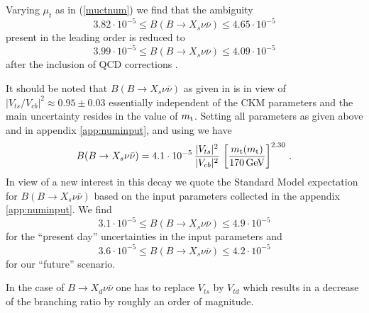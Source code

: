 Varying $\mu_t$ as in (\ref{muctnum}) we find that the ambiguity
\begin{equation}\label{lobxn}
3.82\cdot 10^{-5}\leq B(B\to X_s\nu\bar\nu)\leq 4.65\cdot 10^{-5}
\end{equation}
present in the leading order is reduced to
\begin{equation}\label{nlobxn}
3.99\cdot 10^{-5}\leq B(B\to X_s\nu\bar\nu)\leq 4.09\cdot 10^{-5}
\end{equation}
after the inclusion of QCD corrections \cite{buchallaburas:93b}.

It should be noted that $B(B \to X_s \nu\bar\nu)$ as given in
 is in view of $|V_{ts}/V_{cb}|^2 \approx 0.95 \pm 0.03$
essentially independent of the CKM parameters and the main uncertainty
resides in the value of $m_{\rm t}$. Setting all parameters as given above and
in appendix \ref{app:numinput}, and using  we have
\begin{equation}
B(B \to X_s \nu\bar\nu) = 4.1 \cdot 10^{-5} \,
\frac{|V_{ts}|^2}{|V_{cb}|^2} \,
\left[ \frac{m_{\rm t}(m_{\rm t})}{170\, {\rm GeV}} \right]^{2.30} \, .
\label{eq:bxsnnnum}
\end{equation}
In view of a new interest in this decay \cite{grossmanetal:95} we quote
the Standard Model expectation for $B(B \to X_s \nu\bar\nu)$ based on
the input parameters collected in the appendix \ref{app:numinput}. We
find
\begin{equation}
3.1 \cdot 10^{-5} \le B(B \to X_s \nu\bar\nu) \le 4.9 \cdot 10^{-5}
\label{eq:bxsnnnum2}
\end{equation}
for the ``present day'' uncertainties in the input parameters and
\begin{equation}
3.6 \cdot 10^{-5} \le B(B \to X_s \nu\bar\nu) \le 4.2 \cdot 10^{-5}
\label{eq:bxsnnnum3}
\end{equation}
for our ``future'' scenario. 

In the case of $B\to X_d\nu\bar\nu$ one has to replace $V_{ts}$ by
$V_{td}$ which results in a decrease of the branching ratio by
roughly an order of magnitude.

